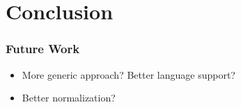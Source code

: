 
\chapter{Conclusion}\label{chapter:conclusion}
\subsection{Future Work}
\begin{itemize}
    \item More generic approach? Better language support?
    \item Better normalization?
\end{itemize}

